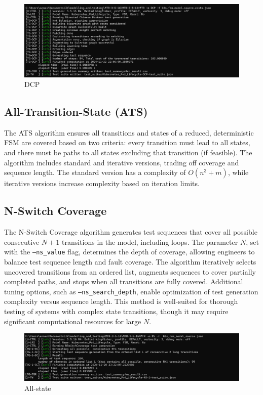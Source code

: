 \documentclass[main.tex]{subfiles}
\begin{document}
\begin{figure}[H]
    \centering
    \includegraphics[width=\textwidth]{test_results/dcp.png}
    \caption{DCP}
    \label{fig:all_state}
\end{figure}

\subsection{All-Transition-State (ATS)}The ATS algorithm ensures all transitions and states of a reduced, deterministic FSM are covered based on two criteria: every transition must lead to all states, and there must be paths to all states excluding that transition (if feasible). The algorithm includes standard and iterative versions, trading off coverage and sequence length. The standard version has a complexity of $O(n^3 + m)$, while iterative versions increase complexity based on iteration limits.


\subsection{N-Switch Coverage}  
The N-Switch Coverage algorithm generates test sequences that cover all possible consecutive \(N+1\) transitions in the model, including loops. The parameter \(N\), set with the \texttt{--ns\_value} flag, determines the depth of coverage, allowing engineers to balance test sequence length and fault coverage. The algorithm iteratively selects uncovered transitions from an ordered list, augments sequences to cover partially completed paths, and stops when all transitions are fully covered. Additional tuning options, such as \texttt{--ns\_search\_depth}, enable optimization of test generation complexity versus sequence length. This method is well-suited for thorough testing of systems with complex state transitions, though it may require significant computational resources for large \(N\).

\begin{figure}[H]
    \centering
    \includegraphics[width=\textwidth]{test_results/n-switch.png}
    \caption{All-state}
    \label{fig:all_state}
\end{figure}
\end{document}

